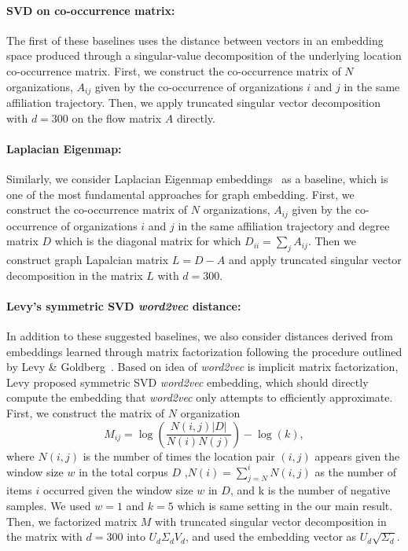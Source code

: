 \documentclass[12pt,a4paper]{article}
\begin{document}
\vspace{-0.5cm}
\paragraph{SVD on co-occurrence matrix:}The first of these baselines uses the distance between vectors in an embedding space produced through a singular-value decomposition of the underlying location co-occurrence matrix. First, we construct the co-occurrence matrix of $N$ organizations, $A_{ij}$ given by the co-occurrence of organizations $i$ and $j$ in the same affiliation trajectory.
Then, we apply truncated singular vector decomposition with $d=300$ on the flow matrix $A$ directly.

\vspace{-0.3cm}
\paragraph{Laplacian Eigenmap:} Similarly, we consider Laplacian Eigenmap embeddings~\autocite{belkin2003laplacian} as a baseline, which is one of the most fundamental approaches for graph embedding. First, we construct the co-occurrence matrix of $N$ organizations, $A_{ij}$ given by the co-occurrence of organizations $i$ and $j$ in the same affiliation trajectory and degree matrix $D$ which is the diagonal matrix for which $D_{ii}=\sum_j {A_{ij}}$. Then we construct graph Lapalcian matrix $L = D-A$  and apply truncated singular vector decomposition in the matrix $L$ with $d=300$.

\vspace{-0.3cm}
\paragraph{Levy's  symmetric SVD \textit{word2vec} distance:} In addition to these suggested baselines, we also consider distances derived from embeddings learned through matrix factorization following the procedure outlined by Levy \& Goldberg~\autocite{levy2014neural}. Based on idea of \textit{word2vec} is implicit matrix factorization, Levy proposed symmetric SVD \textit{word2vec} embedding, which should directly compute the embedding that \textit{word2vec} only attempts to efficiently approximate. First, we construct the matrix of $N$ organization
\begin{equation}
 M_{ij} = \log\left(\frac{N(i,j) |D|}{N(i) N(j)}\right) - \log(k),
\end{equation}
where $N(i,j)$ is the number of times the location pair $(i,j)$ appears given the window size $w$ in the total corpus $D$ ,$N(i)=\sum_{j=N}^i N(i,j)$ as the number of items $i$ occurred given the window size $w$ in $D$, and k is the number of negative samples. We used $w=1$ and $k=5$ which is same setting in the our main result. Then, we factorized matrix $M$ with truncated singular vector decomposition in the matrix with $d=300$ into $U_d \Sigma_d V_d$, and used the embedding vector as $U_d\sqrt{\Sigma_d}$.
\end{document}
